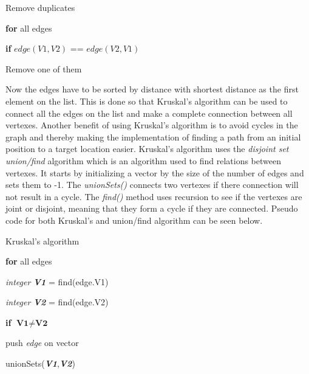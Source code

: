\documentclass[../Head/Main.tex]{subfiles}
\begin{document}
\begin{Pseudo}{Remove duplicates}{}

 	\textbf{for} all edges 
 	
 	 \textbf{if} $edge(V1,V2)$ == $edge(V2,V1)$  
 	 	
	 Remove one of them

\end{Pseudo} 
 
Now the edges have to be sorted by distance with shortest distance as the first element on the list. This is done so that Kruskal's algorithm can be used to connect all the edges on the list and make a complete connection between all vertexes. Another benefit of using Kruskal's algorithm is to avoid cycles in the graph and thereby making the implementation of finding a path from an initial position to a target location easier. Kruskal's algorithm uses the \textit{disjoint set union/find} algorithm which is an algorithm used to find relations between vertexes. It starts by initializing a vector by the size of the number of edges and sets them to -1. The \textit{unionSets()} connects two vertexes if there connection will not result in a cycle.  The \textit{find()} method uses recursion to see if the vertexes are joint or disjoint, meaning that they form a cycle if they are connected. Pseudo code for both Kruskal's and union/find algorithm can be seen below.     

\begin{Pseudo}{Kruskal's algorithm}{}

 	\textbf{for} all edges  
	\begin{Indentation}
		\item 
	\begin{Indentation}
	\item \textit{integer} \textbf{\textit{V1}} = find(edge.V1)
	\item \textit{integer} \textbf{\textit{V2}} = find(edge.V2)
	\item \textbf{if} $\textbf{V1} \neq \textbf{V2}$   	
	\item push \textit{edge} on vector
	\item unionSets(\textbf{\textit{V1}},\textbf{\textit{V2}})

	\end{Indentation}
	
	\end{Indentation}

\end{Pseudo} 
\end{document}
